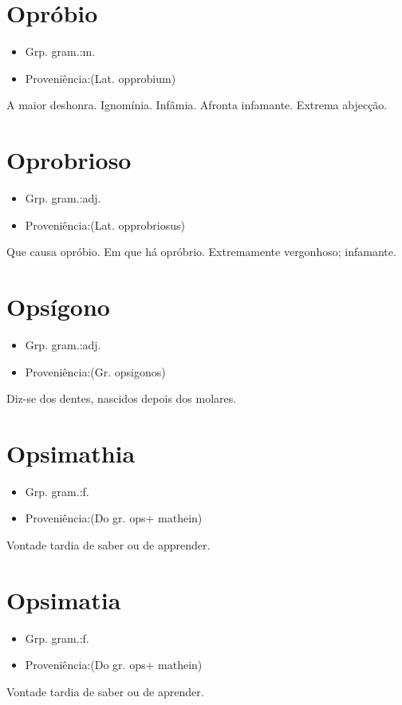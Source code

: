 \section{Opróbio}
\begin{itemize}
\item {Grp. gram.:m.}
\end{itemize}
\begin{itemize}
\item {Proveniência:(Lat. \textunderscore opprobium\textunderscore )}
\end{itemize}
A maior deshonra.
Ignomínia.
Infâmia.
Afronta infamante.
Extrema abjecção.
\section{Oprobrioso}
\begin{itemize}
\item {Grp. gram.:adj.}
\end{itemize}
\begin{itemize}
\item {Proveniência:(Lat. \textunderscore opprobriosus\textunderscore )}
\end{itemize}
Que causa opróbio.
Em que há opróbrio.
Extremamente vergonhoso; infamante.
\section{Opsígono}
\begin{itemize}
\item {Grp. gram.:adj.}
\end{itemize}
\begin{itemize}
\item {Proveniência:(Gr. \textunderscore opsigonos\textunderscore )}
\end{itemize}
Diz-se dos dentes, nascidos depois dos molares.
\section{Opsimathia}
\begin{itemize}
\item {Grp. gram.:f.}
\end{itemize}
\begin{itemize}
\item {Proveniência:(Do gr. \textunderscore ops\textunderscore  + \textunderscore mathein\textunderscore )}
\end{itemize}
Vontade tardia de saber ou de apprender.
\section{Opsimatia}
\begin{itemize}
\item {Grp. gram.:f.}
\end{itemize}
\begin{itemize}
\item {Proveniência:(Do gr. \textunderscore ops\textunderscore  + \textunderscore mathein\textunderscore )}
\end{itemize}
Vontade tardia de saber ou de aprender.
